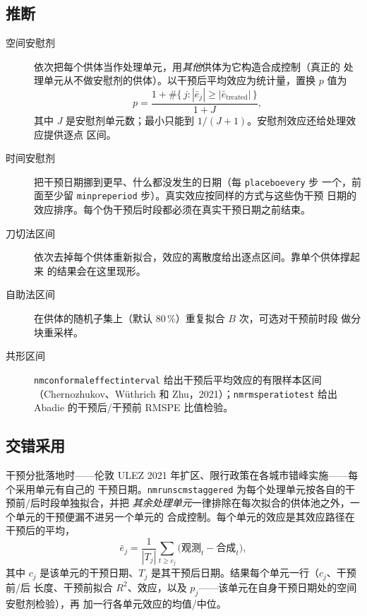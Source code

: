 \documentclass[11pt]{ctexrep}
\newcommand{\codeunderscore}{\textunderscore\allowbreak}
\newcommand{\code}[1]{\texttt{\let\_\codeunderscore #1}}
\begin{document}
\subsection{推断}\label{sec:scminference}
\begin{description}
  \item[空间安慰剂] 依次把每个供体当作处理单元，用\emph{其他}供体为它构造合成控制（真正的
        处理单元从不做安慰剂的供体）。以干预后平均效应为统计量，置换 $p$ 值为
        \begin{equation}
          p = \frac{1 + \#\{\,j : |\bar{e}_j| \ge |\bar{e}_\text{treated}|\,\}}{1 + J},
        \end{equation}
        其中 $J$ 是安慰剂单元数；最小只能到 $1/(J+1)$。安慰剂效应还给处理效应提供逐点
        区间。
  \item[时间安慰剂] 把干预日期挪到更早、什么都没发生的日期（每 \code{placebo\_every} 步
        一个，前面至少留 \code{min\_pre\_period} 步）。真实效应按同样的方式与这些伪干预
        日期的效应排序。每个伪干预后时段都必须在真实干预日期之前结束。
  \item[刀切法区间] 依次去掉每个供体重新拟合，效应的离散度给出逐点区间。靠单个供体撑起来
        的结果会在这里现形。
  \item[自助法区间] 在供体的随机子集上（默认 80\,\%）重复拟合 $B$ 次，可选对干预前时段
        做分块重采样。
  \item[共形区间] \code{nm\_conformal\_effect\_interval} 给出干预后平均效应的有限样本区间
        （Chernozhukov、W\"uthrich 和 Zhu，2021）；\code{nm\_rmspe\_ratio\_test} 给出 Abadie
        的干预后/干预前 RMSPE 比值检验。
\end{description}

\subsection{交错采用}\label{sec:scmstaggered}
干预分批落地时——伦敦 ULEZ 2021 年扩区、限行政策在各城市错峰实施——每个采用单元有自己的
干预日期。\code{nm\_run\_scm\_staggered} 为每个处理单元按各自的干预前/后时段单独拟合，并把
\emph{其余处理单元}一律排除在每次拟合的供体池之外，一个单元的干预便漏不进另一个单元的
合成控制。每个单元的效应是其效应路径在干预后的平均，
\begin{equation}
  \bar{e}_j = \frac{1}{|T_j|} \sum_{t \ge c_j} \bigl(\text{观测}_t - \text{合成}_t\bigr),
\end{equation}
其中 $c_j$ 是该单元的干预日期、$T_j$ 是其干预后日期。结果每个单元一行（$c_j$、干预前/后
长度、干预前拟合 $R^2$、效应，以及 $p_j$——该单元在自身干预日期处的空间安慰剂检验），再
加一行各单元效应的均值/中位。
\end{document}
